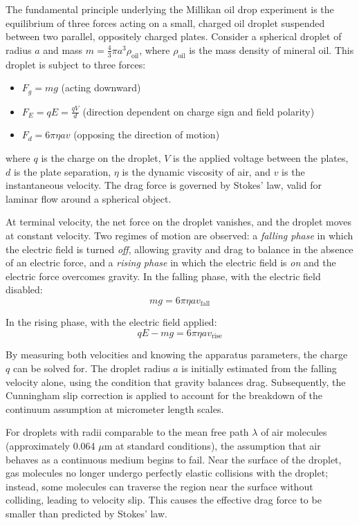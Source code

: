 \documentclass[11pt]{article}
\begin{document}
The fundamental principle underlying the Millikan oil drop experiment is the equilibrium of three forces acting on a small, charged oil droplet suspended between two parallel, oppositely charged plates. Consider a spherical droplet of radius $a$ and mass $m = \frac{4}{3}\pi a^3 \rho_{\text{oil}}$, where $\rho_{\text{oil}}$ is the mass density of mineral oil. This droplet is subject to three forces:

\begin{itemize}
    \item $F_g = mg$ (acting downward)
    \item $F_E = qE = \frac{qV}{d}$ (direction dependent on charge sign and field polarity)
    \item $F_d = 6\pi \eta a v$ (opposing the direction of motion)
\end{itemize}

where $q$ is the charge on the droplet, $V$ is the applied voltage between the plates, $d$ is the plate separation, $\eta$ is the dynamic viscosity of air, and $v$ is the instantaneous velocity. The drag force is governed by Stokes' law, valid for laminar flow around a spherical object.

At terminal velocity, the net force on the droplet vanishes, and the droplet moves at constant velocity. Two regimes of motion are observed: a \emph{falling phase} in which the electric field is turned \emph{off}, allowing gravity and drag to balance in the absence of an electric force, and a \emph{rising phase} in which the electric field is \emph{on} and the electric force overcomes gravity. In the falling phase, with the electric field disabled:
\begin{equation}
mg = 6\pi \eta a v_{\text{fall}}
\end{equation}

In the rising phase, with the electric field applied:
\begin{equation}
qE - mg = 6\pi \eta a v_{\text{rise}}
\end{equation}

By measuring both velocities and knowing the apparatus parameters, the charge $q$ can be solved for. The droplet radius $a$ is initially estimated from the falling velocity alone, using the condition that gravity balances drag. Subsequently, the Cunningham slip correction is applied to account for the breakdown of the continuum assumption at micrometer length scales.

For droplets with radii comparable to the mean free path $\lambda$ of air molecules (approximately 0.064 $\mu$m at standard conditions), the assumption that air behaves as a continuous medium begins to fail. Near the surface of the droplet, gas molecules no longer undergo perfectly elastic collisions with the droplet; instead, some molecules can traverse the region near the surface without colliding, leading to velocity slip. This causes the effective drag force to be smaller than predicted by Stokes' law.
\end{document}
